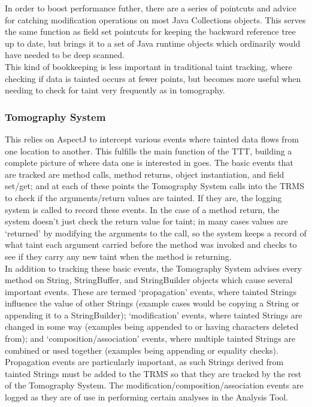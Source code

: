 \documentclass[msc,oneside]{ubcthesis}
\begin{document}
In order to boost performance futher, there are a series of pointcuts and advice for catching modification operations on most Java Collections objects. This serves the same function as field set pointcuts for keeping the backward reference tree up to date, but brings it to a set of Java runtime objects which ordinarily would have needed to be deep scanned.\\

This kind of bookkeeping is less important in traditional taint tracking, where checking if data is tainted occurs at fewer points, but becomes more useful when needing to check for taint very frequently as in tomography.

\subsubsection{Tomography System} 
\label{subsub:trms}
This relies on AspectJ to intercept various events where tainted data flows from one location to another. This fulfills the main function of the TTT, building a complete picture of where data one is interested in goes. The basic events that are tracked are method calls, method returns, object instantiation, and field set/get; and at each of these points the Tomography System calls into the TRMS to check if the arguments/return values are tainted. If they are, the logging system is called to record these events. In the case of a method return, the system doesn't just check the return value for taint; in many cases values are `returned' by modifying the arguments to the call, so the system keeps a record of what taint each argument carried before the method was invoked and checks to see if they carry any new taint when the method is returning. \\

In addition to tracking these basic events, the Tomography System advises every method on String, StringBuffer, and StringBuilder objects which cause several important events. These are termed `propagation' events, where tainted Strings influence the value of other Strings (example cases would be copying a String or appending it to a StringBuilder); `modification' events, where tainted Strings are changed in some way (examples being appended to or having characters deleted from); and `composition/association' events, where multiple tainted Strings are combined or used together (examples being appending or equality checks). Propagation events are particularly important, as such Strings derived from tainted Strings must be added to the TRMS so that they are tracked by the rest of the Tomography System. The modification/composition/association events are logged as they are of use in performing certain analyses in the Analysis Tool.\\
\end{document}
